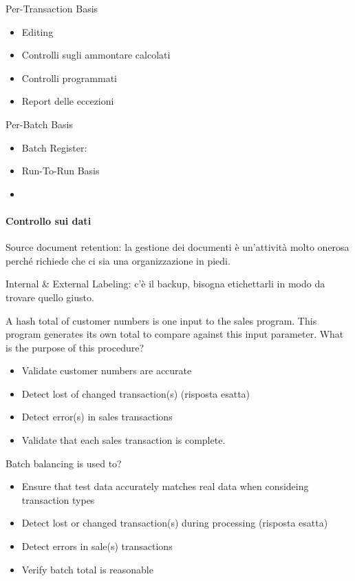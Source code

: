 Per-Transaction Basis 
\begin{itemize}
\item Editing
\item Controlli sugli ammontare calcolati
\item Controlli programmati
\item Report delle eccezioni
\end{itemize}

Per-Batch Basis

\begin{itemize}
\item Batch Register:
\item Run-To-Run Basis
\item
\end{itemize}

\paragraph{Controllo sui dati}


Source document retention: la gestione dei documenti è un'attività molto onerosa
perché richiede che ci sia una organizzazione in piedi.

Internal \& External Labeling: c'è il backup, bisogna etichettarli in modo da
trovare quello giusto.



A hash total of customer numbers is one input to the sales program. This program
generates its own total to compare against this input parameter. What is the
purpose of this procedure?

\begin{itemize}
\item Validate customer numbers are accurate
\item Detect lost of changed transaction(s) (risposta esatta)
\item Detect error(s) in sales transactions
\item Validate that each sales transaction is complete.
\end{itemize}




Batch balancing is used to?

\begin{itemize}
\item Ensure that test data accurately matches real data when consideing
transaction types
\item Detect lost or changed transaction(s) during processing (risposta esatta)
\item Detect errors in sale(s) transactions
\item Verify batch total is reasonable
\end{itemize}



